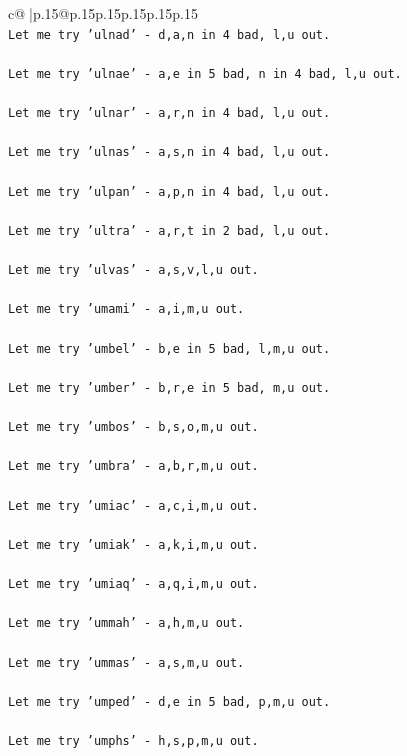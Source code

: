 \documentclass{article}
\begin{document}
{\begin{supertabular}{c@{$\;$}|p{.15\linewidth}@{}p{.15\linewidth}p{.15\linewidth}p{.15\linewidth}p{.15\linewidth}p{.15\linewidth}}
{{{\\ 
\texttt{Let me try 'ulnad' {-} d,a,n in 4 bad, l,u out. } \\
\\ 
\texttt{Let me try 'ulnae' {-} a,e in 5 bad, n in 4 bad, l,u out. } \\
\\ 
\texttt{Let me try 'ulnar' {-} a,r,n in 4 bad, l,u out. } \\
\\ 
\texttt{Let me try 'ulnas' {-} a,s,n in 4 bad, l,u out. } \\
\\ 
\texttt{Let me try 'ulpan' {-} a,p,n in 4 bad, l,u out. } \\
\\ 
\texttt{Let me try 'ultra' {-} a,r,t in 2 bad, l,u out. } \\
\\ 
\texttt{Let me try 'ulvas' {-} a,s,v,l,u out. } \\
\\ 
\texttt{Let me try 'umami' {-} a,i,m,u out. } \\
\\ 
\texttt{Let me try 'umbel' {-} b,e in 5 bad, l,m,u out. } \\
\\ 
\texttt{Let me try 'umber' {-} b,r,e in 5 bad, m,u out. } \\
\\ 
\texttt{Let me try 'umbos' {-} b,s,o,m,u out. } \\
\\ 
\texttt{Let me try 'umbra' {-} a,b,r,m,u out. } \\
\\ 
\texttt{Let me try 'umiac' {-} a,c,i,m,u out. } \\
\\ 
\texttt{Let me try 'umiak' {-} a,k,i,m,u out. } \\
\\ 
\texttt{Let me try 'umiaq' {-} a,q,i,m,u out. } \\
\\ 
\texttt{Let me try 'ummah' {-} a,h,m,u out. } \\
\\ 
\texttt{Let me try 'ummas' {-} a,s,m,u out. } \\
\\ 
\texttt{Let me try 'umped' {-} d,e in 5 bad, p,m,u out. } \\
\\ 
\texttt{Let me try 'umphs' {-} h,s,p,m,u out. } \\
}}}
\end{supertabular}}
\end{document}
